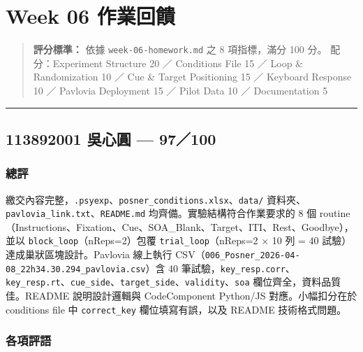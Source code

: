 \documentclass[14pt,]{extarticle}
\date{}
\begin{document}
\hypertarget{week-06-ux4f5cux696dux56deux994b}{%
\section{Week 06 作業回饋}\label{week-06-ux4f5cux696dux56deux994b}}

\begin{quote}
\textbf{評分標準：} 依據 \texttt{week-06-homework.md} 之 8 項指標，滿分
100 分。 配分：Experiment Structure 20 ／ Conditions File 15 ／ Loop \&
Randomization 10 ／ Cue \& Target Positioning 15 ／ Keyboard Response 10
／ Pavlovia Deployment 15 ／ Pilot Data 10 ／ Documentation 5
\end{quote}

\begin{center}\rule{0.5\linewidth}{0.4pt}\end{center}

\hypertarget{ux5433ux5fc3ux5713-97100}{%
\subsection{113892001 吳心圓 ---
97／100}\label{ux5433ux5fc3ux5713-97100}}

\hypertarget{ux7e3dux8a55}{%
\subsubsection{總評}\label{ux7e3dux8a55}}

繳交內容完整，\texttt{.psyexp}、\texttt{posner\_conditions.xlsx}、\texttt{data/}
資料夾、\texttt{pavlovia\_link.txt}、\texttt{README.md}
均齊備。實驗結構符合作業要求的 8 個
routine（Instructions、Fixation、Cue、SOA\_Blank、Target、ITI、Rest、Goodbye），並以
\texttt{block\_loop}（nReps=2）包覆 \texttt{trial\_loop}（nReps=2 × 10
列 = 40 試驗）達成巢狀區塊設計。Pavlovia 線上執行
CSV（\texttt{006\_Posner\_2026-04-08\_22h34.30.294\_pavlovia.csv}）含 40
筆試驗，\texttt{key\_resp.corr}、\texttt{key\_resp.rt}、\texttt{cue\_side}、\texttt{target\_side}、\texttt{validity}、\texttt{soa}
欄位齊全，資料品質佳。README 說明設計邏輯與 CodeComponent Python/JS
對應。小幅扣分在於 conditions file 中 \texttt{correct\_key}
欄位填寫有誤，以及 README 技術格式問題。

\hypertarget{ux5404ux9805ux8a55ux8a9e}{%
\subsubsection{各項評語}\label{ux5404ux9805ux8a55ux8a9e}}
\end{document}
